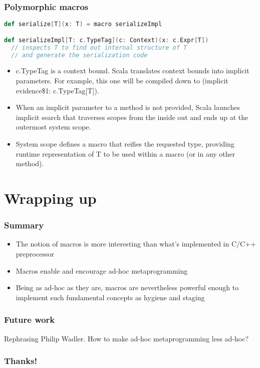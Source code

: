 \documentclass[hyperref={bookmarks=false}]{beamer}
\begin{document}
\begin{frame}[fragile]
\frametitle{Polymorphic macros}

\begin{lstlisting}[language=scala]
def serialize[T](x: T) = macro serializeImpl

def serializeImpl[T: c.TypeTag](c: Context)(x: c.Expr[T])
  // inspects T to find out internal structure of T
  // and generate the serialization code
\end{lstlisting}

\begin{itemize}
\item c.TypeTag is a context bound. Scala translates context bounds into implicit parameters. For example, this one will be compiled down to (implicit evidence\$1: c.TypeTag[T]).
\item When an implicit parameter to a method is not provided, Scala launches implicit search that traverses scopes from the inside out and ends up at the outermost system scope.
\item System scope defines a macro that reifies the requested type, providing runtime representation of T to be used within a macro (or in any other method).
\end{itemize}

\end{frame}

\section{Wrapping up}

\begin{frame}[fragile]
\frametitle{Summary}

\begin{itemize}
\item The notion of macros is more interesting than what's implemented in C/C++ preprocessor
\item Macros enable and encourage ad-hoc metaprogramming
\item Being as ad-hoc as they are, macros are nevertheless powerful enough to implement such fundamental concepts as hygiene and staging
\end{itemize}

\end{frame}

\begin{frame}[fragile]
\frametitle{Future work}

Rephrasing Philip Wadler. How to make ad-hoc metaprogramming less ad-hoc?

\end{frame}

\begin{frame}[fragile]
\frametitle{Thanks!}

\centering



\end{frame}
\end{document}
